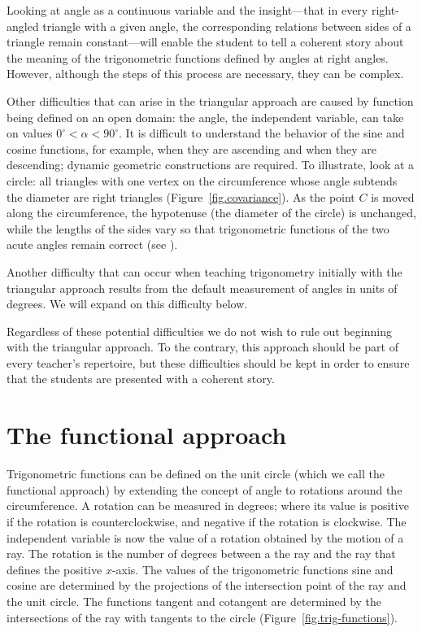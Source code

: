 Looking at angle as a continuous variable and the insight---that in every right-angled triangle with a given angle, the corresponding relations between sides of a triangle remain constant---will enable the student to tell a coherent story about the meaning of the trigonometric functions defined by angles at right angles. However, although the steps of this process are necessary, they can be complex.


Other difficulties that can arise in the triangular approach are caused by function being defined on an open domain: the angle, the independent variable, can take on values $0^\circ<\alpha<90^\circ$.
It is difficult to understand the behavior of the sine and cosine functions, for example, when they are ascending and when they are descending; dynamic geometric constructions are required.
To illustrate, look at a circle: all triangles with one vertex on the circumference whose angle subtends the diameter are right triangles (Figure~\ref{fig.covariance}). As the point $C$ is moved along the circumference, the hypotenuse (the diameter of the circle) is unchanged, while the lengths of the sides vary so that trigonometric functions of the two acute angles remain correct (see ).

Another difficulty that can occur when teaching trigonometry initially with the triangular approach results from the default measurement of angles in units of degrees. We will expand on this  difficulty below.

Regardless of these potential difficulties we do not wish to rule out beginning with the triangular approach.
To the contrary, this approach should be part of every teacher's repertoire, but these difficulties should be kept in order to ensure that the students are presented with a coherent story.

\section{The functional approach}

Trigonometric functions can be defined on the unit circle (which we call the functional approach) by extending the concept of angle to rotations around the circumference.
A rotation can be measured in degrees; where its value is positive  if the rotation is counterclockwise, and negative if the rotation is clockwise.
The independent variable is now the value of a rotation obtained by the motion of a ray. The rotation is the number of degrees between a the ray and the ray that defines the positive $x$-axis.
The values of the trigonometric functions sine and cosine are determined by the projections of the intersection point of the ray and the unit circle. The functions tangent and cotangent are determined by the intersections of the ray with tangents to the circle (Figure~\ref{fig.trig-functions}).

